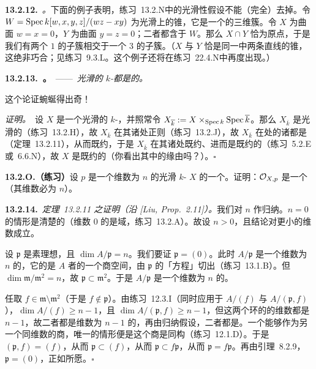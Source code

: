 \textbf{13.2.12.}\ \emph{\trhRemark{}。}\quad 下面的例子表明，\mbox{练习~13.2.N}中的光滑性假设不能（完全）去掉。令 $W=\operatorname{Spec} k[w,x,y,z]/(wz-xy)$ 为光滑\trQuadricSurface{}上的锥，它是一个\trIntegral{}的三维簇。令 $X$ 为曲面 $w=x=0$，$Y$ 为曲面 $y=z=0$；二者都含于 $W$。那么 $X\cap Y$ 恰为原点，于是我们有两个\trCodimension{} $1$ 的子簇相交于一个\trCodimension{} $3$ 的子簇。（$X$ 与 $Y$ 恰是同一\trRuling{}中两条直线的\trAffine{}锥，这绝非巧合；见\mbox{练习~9.3.L}。这个例子还将在\mbox{练习~22.4.N}中再度出现。）

\textbf{13.2.13.\ \trhProposition{}。}\ ——\ \emph{光滑的 $k$-\trScheme{}都是\trReduced{}的。}

这个论证蜿蜒得出奇！

\emph{证明。}\ 设 $X$ 是一个光滑的 $k$-\trScheme，并照常令 $X_{\overline{k}}:=X\times_{\operatorname{Spec} k}\operatorname{Spec}\overline{k}$。那么 $X_{\overline{k}}$ 是光滑的（\mbox{练习~13.2.H}），故 $X_{\overline{k}}$ 在其诸\trClosedPoint{}处正则（\mbox{练习~13.2.J}），故 $X_{\overline{k}}$ 在\trClosedPoint{}处的诸\trLocalRing{}都是\trIntegralDomain（定理~13.2.11），从而既约，于是 $X_{\overline{k}}$ 在其诸\trClosedPoint{}处既约、进而是既约的（\mbox{练习~5.2.E}或~6.6.N），故 $X$ 是既约的（你看出其中的缘由吗？）。\hfill$\square$

\textbf{13.2.O.（练习）}\quad 设 $p$ 是一个维数为 $n$ 的光滑 $k$-\trScheme{} $X$ 的一个\trClosedPoint。证明：$\mathcal{O}_{X,p}$ 是一个\trIntegralDomain（其维数必为 $n$）。

\textbf{13.2.14.}\ \emph{定理~13.2.11 之证明（沿 [Liu, Prop.~2.11]）。}\quad 我们对 $n$ 作归纳。$n=0$ 的情形是清楚的（维数 $0$ 的\trRegular\trLocalRing{}是域，\mbox{练习~13.2.A}）。故设 $n>0$，且结论对更小的维数成立。

设 $\mathfrak{p}$ 是素理想，且 $\dim A/\mathfrak{p}=n$。我们要证 $\mathfrak{p}=(0)$。此时 $A/\mathfrak{p}$ 是一个维数为 $n$ 的\trNoetherian\trLocalRing，它的\trZariski{}\trCotangentSpace{}是 $A$ 者的一个商空间，由 $\mathfrak{p}$ 的「方程」切出（\mbox{练习~13.1.B}）。但 $\dim\mathfrak{m}/\mathfrak{m}^2=n$，故 $\mathfrak{p}\subset\mathfrak{m}^2$。于是 $A/\mathfrak{p}$ 是一个维数为 $n$ 的\trRegular\trLocalRing。

任取 $f\in\mathfrak{m}\setminus\mathfrak{m}^2$（于是 $f\notin\mathfrak{p}$）。由\mbox{练习~12.3.I}（同时应用于 $A/(f)$ 与 $A/(\mathfrak{p},f)$），$\dim A/(f)\ge n-1$，且 $\dim A/(\mathfrak{p},f)\ge n-1$，但这两个环的\trZariski{}\trTangentSpace{}的维数都是 $n-1$，故二者都是维数为 $n-1$ 的\trRegular\trLocalRing，再由归纳假设，二者都是\trIntegralDomain。一个\trIntegralDomain{}能够作为另一个同维数\trIntegralDomain{}的商，唯一的情形便是这个商是同构（\mbox{练习~12.1.D}）。于是 $(\mathfrak{p},f)=(f)$，从而 $\mathfrak{p}\subset(f)$，从而 $\mathfrak{p}\subset f\mathfrak{p}$，从而 $\mathfrak{p}=f\mathfrak{p}$。再由\trNakayama{}引理~8.2.9，$\mathfrak{p}=(0)$，正如所愿。\hfill$\square$


